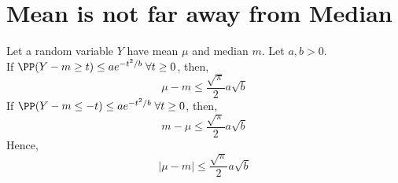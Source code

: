 \section{Mean is not far away from Median}
\begin{lemma}
Let a random variable $Y$ have mean $\mu$ and median $m$. Let $a, b > 0$. \\
If $\PP(Y - m \geq t) \leq a e^{-t^2/b} \; \forall t \geq 0$, then,
\[
\mu - m \leq \frac{\sqrt{\pi}}{2} a \sqrt b
\]
If $\PP(Y - m \leq -t) \leq a e^{-t^2/b} \; \forall t \geq 0$, then,
\[
m - \mu \leq \frac{\sqrt{\pi}}{2} a \sqrt b
\]
Hence,
\begin{equation}
    |\mu - m| \leq \frac{\sqrt\pi}{2} a \sqrt{b}
\end{equation}
\end{lemma}